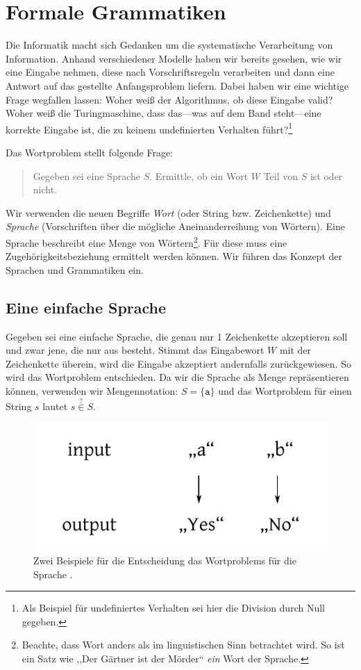 \chapter{Formale Grammatiken}
%
Die Informatik macht sich Gedanken um die systematische Verarbeitung von Information. Anhand verschiedener Modelle haben wir bereits gesehen, wie wir eine Eingabe nehmen, diese nach Vorschriftsregeln verarbeiten und dann eine Antwort auf das gestellte Anfangsproblem liefern. Dabei haben wir eine wichtige Frage wegfallen lassen: Woher weiß der Algorithmus, ob diese Eingabe valid? Woher weiß die Turingmaschine, dass das---was auf dem Band steht---eine korrekte Eingabe ist, die zu keinem undefinierten Verhalten führt?\footnote{Als Beispiel für undefiniertes Verhalten sei hier die Division durch Null gegeben.}

Das Wortproblem stellt folgende Frage:
\begin{quotation}
  Gegeben sei eine Sprache $S$. Ermittle, ob ein Wort $W$ Teil von $S$ ist oder nicht.
\end{quotation}
%
Wir verwenden die neuen Begriffe \emph{Wort} (oder String bzw. Zeichenkette) und \emph{Sprache} (Vorschriften über die mögliche Aneinanderreihung von Wörtern). Eine Sprache beschreibt eine Menge von Wörtern\footnote{Beachte, dass Wort anders als im linguistischen Sinn betrachtet wird. So ist ein Satz wie ,,Der Gärtner ist der Mörder`` \emph{ein} Wort der Sprache.}. Für diese muss eine Zugehörigkeitsbeziehung ermittelt werden können. Wir führen das Konzept der Sprachen und Grammatiken ein.

\section{Eine einfache Sprache}
%
Gegeben sei eine einfache Sprache, die genau nur 1 Zeichenkette akzeptieren soll und zwar jene, die nur aus  besteht. Stimmt das Eingabewort $W$ mit der Zeichenkette  überein, wird die Eingabe akzeptiert andernfalls zurückgewiesen. So wird das Wortproblem entschieden. Da wir die Sprache als Menge repräsentieren können, verwenden wir Mengennotation: $S = \{\texttt{a}\}$ und das Wortproblem für einen String $s$ lautet $s \stackrel{?}{\in} S$.
%
\begin{figure}[ht]
 \begin{center}
  \includegraphics{img/wordproblem.pdf}
  \caption{Zwei Beispiele für die Entscheidung das Wortproblems für die Sprache .}
  \label{fig:wordproblem}
 \end{center}
\end{figure}

